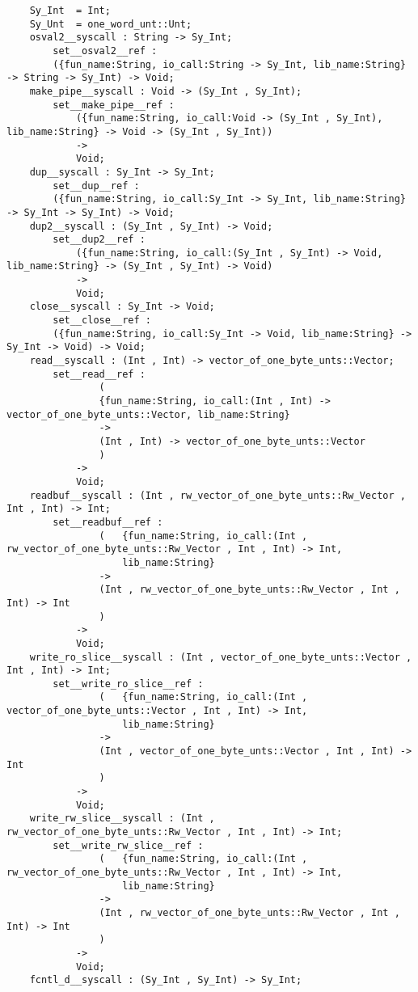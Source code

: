 \begin{verbatim}
    Sy_Int  = Int;
    Sy_Unt  = one_word_unt::Unt;
    osval2__syscall : String -> Sy_Int;
        set__osval2__ref :
        ({fun_name:String, io_call:String -> Sy_Int, lib_name:String} -> String -> Sy_Int) -> Void;
    make_pipe__syscall : Void -> (Sy_Int , Sy_Int);
        set__make_pipe__ref :
            ({fun_name:String, io_call:Void -> (Sy_Int , Sy_Int), lib_name:String} -> Void -> (Sy_Int , Sy_Int))
            ->
            Void;
    dup__syscall : Sy_Int -> Sy_Int;
        set__dup__ref :
        ({fun_name:String, io_call:Sy_Int -> Sy_Int, lib_name:String} -> Sy_Int -> Sy_Int) -> Void;
    dup2__syscall : (Sy_Int , Sy_Int) -> Void;
        set__dup2__ref :
            ({fun_name:String, io_call:(Sy_Int , Sy_Int) -> Void, lib_name:String} -> (Sy_Int , Sy_Int) -> Void)
            ->
            Void;
    close__syscall : Sy_Int -> Void;
        set__close__ref :
        ({fun_name:String, io_call:Sy_Int -> Void, lib_name:String} -> Sy_Int -> Void) -> Void;
    read__syscall : (Int , Int) -> vector_of_one_byte_unts::Vector;
        set__read__ref :
                (
                {fun_name:String, io_call:(Int , Int) -> vector_of_one_byte_unts::Vector, lib_name:String}
                ->
                (Int , Int) -> vector_of_one_byte_unts::Vector
                )
            ->
            Void;
    readbuf__syscall : (Int , rw_vector_of_one_byte_unts::Rw_Vector , Int , Int) -> Int;
        set__readbuf__ref :
                (   {fun_name:String, io_call:(Int , rw_vector_of_one_byte_unts::Rw_Vector , Int , Int) -> Int,
                    lib_name:String}
                ->
                (Int , rw_vector_of_one_byte_unts::Rw_Vector , Int , Int) -> Int
                )
            ->
            Void;
    write_ro_slice__syscall : (Int , vector_of_one_byte_unts::Vector , Int , Int) -> Int;
        set__write_ro_slice__ref :
                (   {fun_name:String, io_call:(Int , vector_of_one_byte_unts::Vector , Int , Int) -> Int,
                    lib_name:String}
                ->
                (Int , vector_of_one_byte_unts::Vector , Int , Int) -> Int
                )
            ->
            Void;
    write_rw_slice__syscall : (Int , rw_vector_of_one_byte_unts::Rw_Vector , Int , Int) -> Int;
        set__write_rw_slice__ref :
                (   {fun_name:String, io_call:(Int , rw_vector_of_one_byte_unts::Rw_Vector , Int , Int) -> Int,
                    lib_name:String}
                ->
                (Int , rw_vector_of_one_byte_unts::Rw_Vector , Int , Int) -> Int
                )
            ->
            Void;
    fcntl_d__syscall : (Sy_Int , Sy_Int) -> Sy_Int;

\end{verbatim}
